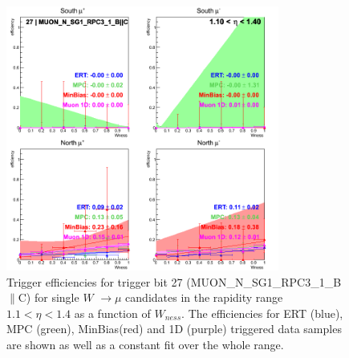 \begin{figure}[h!]

  \centering

  \includegraphics[width=0.8\textwidth]{./figures/run13_trigeffisn_eta0_trig27_lin.png}
  \caption{\label{fig:run13_trigeffisn_eta0_nper0_trig27_lin} Trigger efficiencies for trigger bit 27 (MUON\_N\_SG1\_RPC3\_1\_B$\|$C) for single $W$ $\rightarrow \mu$ candidates in the rapidity range $ 1.1 < \eta < 1.4$ as a function of $W_{ness}$. The efficiencies for ERT (blue), MPC (green), MinBias(red) and 1D (purple) triggered data samples are shown as well as a constant fit over the whole range.}

\end{figure}
\clearpage
